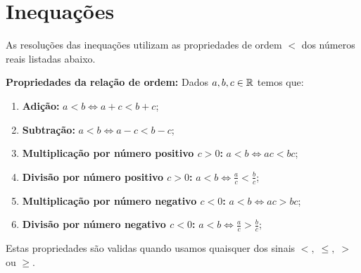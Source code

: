 \chapter{Inequações}

As resoluções das inequações utilizam as propriedades de ordem $<$ dos números reais listadas abaixo.


\begin{obs}
\textbf{Propriedades da relação de ordem:} Dados $a,b,c \in \mathbb{R}$ temos que:
\begin{enumerate}[P1)]
\item \textbf{Adição:} $a < b \Leftrightarrow a+c < b+c$;
\item \textbf{Subtração:} $a < b \Leftrightarrow a-c < b-c$;
\item \textbf{Multiplicação por número positivo $c>0$:} $a<b \Leftrightarrow ac<bc$;
\item \textbf{Divisão por número positivo $c>0$:} $a<b \Leftrightarrow \frac{a}{c}<\frac{b}{c}$;
\item \textbf{Multiplicação por número negativo $c<0$:} $a<b \Leftrightarrow ac>bc$;
\item \textbf{Divisão por número negativo $c<0$:} $a<b \Leftrightarrow \frac{a}{c}>\frac{b}{c}$;
\end{enumerate}

Estas propriedades são validas quando usamos quaisquer dos sinais $<, \;\leq, \; >$ ou $\geq$.
\end{obs}


